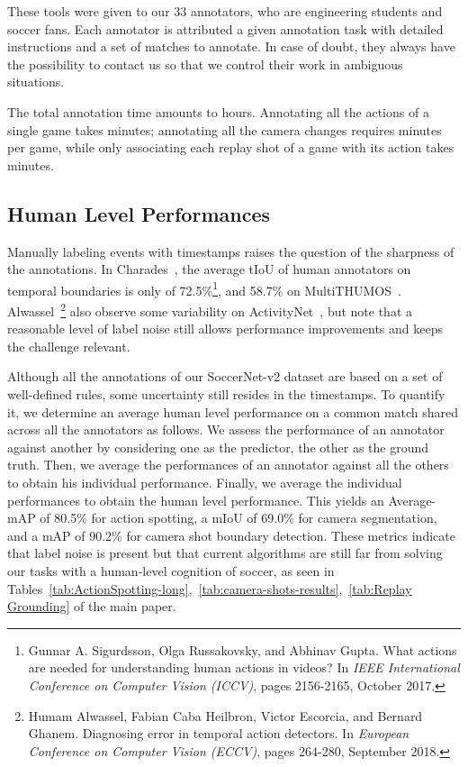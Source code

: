 \documentclass[final]{cvsports}
\begin{document}
These tools were given to our 33 annotators, who are engineering students and soccer fans. Each annotator is attributed a given annotation task with detailed instructions and a set of matches to annotate. In case of doubt, they always have the possibility to contact us so that we control their work in ambiguous situations.

The total annotation time amounts to  hours. Annotating all the actions of a single game takes  minutes; annotating all the camera changes requires  minutes per game, while only associating each replay shot of a game with its action takes  minutes.   


\subsection{Human Level Performances}
Manually labeling events with timestamps raises the question of the sharpness of the annotations. In Charades~\cite{sigurdsson2016hollywood}, the average tIoU of human annotators on temporal boundaries is only of 72.5\%\footnote{Gunnar A. Sigurdsson, Olga Russakovsky, and Abhinav Gupta. What actions are needed for understanding human actions in videos? In \emph{IEEE International Conference on Computer Vision (ICCV)}, pages 2156-2165, October 2017.}, and 58.7\% on MultiTHUMOS~\cite{yeung2018every}.  Alwassel~\etal\footnote{Humam Alwassel, Fabian Caba Heilbron, Victor Escorcia, and Bernard Ghanem. Diagnosing error in temporal action detectors. In \emph{European Conference on Computer Vision (ECCV)}, pages 264-280, September 2018.} also observe some variability on ActivityNet~\cite{caba2015activitynet}, but note that a reasonable level of label noise still allows performance improvements and keeps the challenge relevant. 

Although all the annotations of our SoccerNet-v2 dataset are based on a set of well-defined rules, some uncertainty still resides in the timestamps. 
To quantify it, we determine an average human level performance on a common match shared across all the annotators as follows.
We assess the performance of an annotator against another by considering one as the predictor, the other as the ground truth. Then, we average the performances of an annotator against all the others to obtain his individual performance. Finally, we average the individual performances to obtain the human level performance. This yields an Average-mAP of 80.5\% for action spotting, a mIoU of 69.0\% for camera segmentation, and a mAP of 90.2\% for camera shot boundary detection. These metrics indicate that label noise is present but that current algorithms are still far from solving our tasks with a human-level cognition of soccer, as seen in Tables~\ref{tab:ActionSpotting-long},~\ref{tab:camera-shots-results},~\ref{tab:Replay Grounding} of the main paper.
\end{document}
